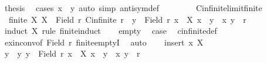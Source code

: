 \begin{isabellebody}
\ {\isacharquery}{\kern0pt}thesis\ \isamarkupfalse%
\ {\isacharparenleft}{\kern0pt}cases\ {\isachardoublequoteopen}x{}\ {\isacharequal}{\kern0pt}\ y{}{\isachardoublequoteclose}{\isacharparenright}{\kern0pt}\ {\isacharparenleft}{\kern0pt}auto\ simp{\isacharcolon}{\kern0pt}\ antisym{\isacharunderscore}{\kern0pt}def{\isacharparenright}{\kern0pt}\isanewline
\ \ \ \ \isamarkupfalse%
\isanewline
\ \ \isamarkupfalse%
\isanewline
{}\isamarkupfalse%
%
\endisatagproof
{\isafoldproof}%
%
\isadelimproof
\isanewline
%
\endisadelimproof
\isanewline
{}\isamarkupfalse%
\ Cinfinite{\isacharunderscore}{\kern0pt}limit{\isacharunderscore}{\kern0pt}finite{\isacharcolon}{\kern0pt}\isanewline
\ \ {\isachardoublequoteopen}{\isasymlbrakk}finite\ X{\isacharsemicolon}{\kern0pt}\ X\ {\isasymsubseteq}\ Field\ r{\isacharsemicolon}{\kern0pt}\ Cinfinite\ r{\isasymrbrakk}\ {\isasymLongrightarrow}\ {\isasymexists}y\ {\isasymin}\ Field\ r{\isachardot}{\kern0pt}\ {\isasymforall}x\ {\isasymin}\ X{\isachardot}{\kern0pt}\ {\isacharparenleft}{\kern0pt}x\ {\isasymnoteq}\ y\ {\isasymand}\ {\isacharparenleft}{\kern0pt}x{\isacharcomma}{\kern0pt}\ y{\isacharparenright}{\kern0pt}\ {\isasymin}\ r{\isacharparenright}{\kern0pt}{\isachardoublequoteclose}\isanewline
%
\isadelimproof
%
\endisadelimproof
%
\isatagproof
{}\isamarkupfalse%
\ {\isacharparenleft}{\kern0pt}induct\ X\ rule{\isacharcolon}{\kern0pt}\ finite{\isacharunderscore}{\kern0pt}induct{\isacharparenright}{\kern0pt}\isanewline
\ \ \isamarkupfalse%
\ empty\ \isamarkupfalse%
\ {\isacharquery}{\kern0pt}case\ \isamarkupfalse%
\ cinfinite{\isacharunderscore}{\kern0pt}def\ \isamarkupfalse%
\ ex{\isacharunderscore}{\kern0pt}in{\isacharunderscore}{\kern0pt}conv{\isacharbrackleft}{\kern0pt}of\ {\isachardoublequoteopen}Field\ r{\isachardoublequoteclose}{\isacharbrackright}{\kern0pt}\ finite{\isachardot}{\kern0pt}emptyI\ \isamarkupfalse%
\ auto\isanewline
{}\isamarkupfalse%
\isanewline
\ \ \isamarkupfalse%
\ {\isacharparenleft}{\kern0pt}insert\ x\ X{\isacharparenright}{\kern0pt}\isanewline
\ \ \isamarkupfalse%
\ \isamarkupfalse%
\ y\ \ y{\isacharcolon}{\kern0pt}\ {\isachardoublequoteopen}y\ {\isasymin}\ Field\ r{\isachardoublequoteclose}\ {\isachardoublequoteopen}{\isasymforall}x\ {\isasymin}\ X{\isachardot}{\kern0pt}\ {\isacharparenleft}{\kern0pt}x\ {\isasymnoteq}\ y\ {\isasymand}\ {\isacharparenleft}{\kern0pt}x{\isacharcomma}{\kern0pt}\ y{\isacharparenright}{\kern0pt}\ {\isasymin}\ r{\isacharparenright}{\kern0pt}{\isachardoublequoteclose}\ \isamarkupfalse%

\end{isabellebody}
